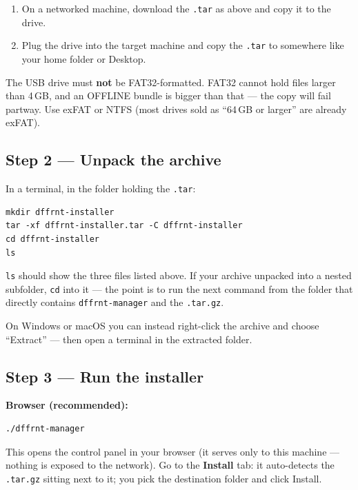 \documentclass[11pt,letterpaper]{article}
\begin{document}
\begin{enumerate}
  \item On a networked machine, download the \texttt{.tar} as above and copy
        it to the drive.
  \item Plug the drive into the target machine and copy the \texttt{.tar} to
        somewhere like your home folder or Desktop.
\end{enumerate}

\begin{gwarn}
The USB drive must \textbf{not} be FAT32-formatted. FAT32 cannot hold files
larger than 4\,GB, and an OFFLINE bundle is bigger than that --- the copy will
fail partway. Use exFAT or NTFS (most drives sold as ``64\,GB or larger'' are
already exFAT).
\end{gwarn}

\subsection{Step 2 --- Unpack the archive}

In a terminal, in the folder holding the \texttt{.tar}:

\begin{lstlisting}
mkdir dffrnt-installer
tar -xf dffrnt-installer.tar -C dffrnt-installer
cd dffrnt-installer
ls
\end{lstlisting}

\texttt{ls} should show the three files listed above. If your archive
unpacked into a nested subfolder, \texttt{cd} into it --- the point is to run
the next command from the folder that directly contains
\texttt{dffrnt-manager} and the \texttt{.tar.gz}.

On Windows or macOS you can instead right-click the archive and choose
``Extract'' --- then open a terminal in the extracted folder.

\subsection{Step 3 --- Run the installer}

\textbf{Browser (recommended):}

\begin{lstlisting}
./dffrnt-manager
\end{lstlisting}

This opens the control panel in your browser (it serves only to this machine
--- nothing is exposed to the network). Go to the \textbf{Install} tab: it
auto-detects the \texttt{.tar.gz} sitting next to it; you pick the
destination folder and click Install.
\end{document}
